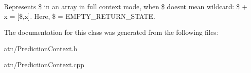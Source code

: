Represents \$ in an array in full context mode, when \$ doesn\textquotesingle{}t mean wildcard\+: \$ + x = \mbox{[}\$,x\mbox{]}. Here, \$ = E\+M\+P\+T\+Y\+\_\+\+R\+E\+T\+U\+R\+N\+\_\+\+S\+T\+A\+TE. 

The documentation for this class was generated from the following files\+:\begin{DoxyCompactItemize}
\item 
atn/Prediction\+Context.\+h\item 
atn/Prediction\+Context.\+cpp\end{DoxyCompactItemize}
